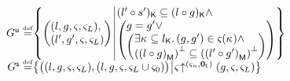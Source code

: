 \begin{definition}[Guarantee]
\[\begin{array}{@{} r @{} l @{}}
	\updateG \eqdef &
 	\left\{
	\begin{array}{@{} l @{\hspace*{2pt}} | @{\hspace*{2pt}} r @{}}
	   	\left(
	   	\begin{array}{@{} l @{}}
	     	(l, g, \amod{}, \amod{L}),\\
	     	(l', g', \amod{}, \amod{L})
	   	\end{array}
		\right)
	  	&
	  	\begin{array}{@{} l @{} }
	  		\capPart{(l' \composeL s')}  \subseteq \capPart{(l \composeL g)} \land\\
		  	\left(
		  	\begin{array}{@{} l @{} }
		 		g = g' \lor\\
		 	  	\left(
		 	  	\begin{array}{@{} l @{}}
		 	  		\exsts{\ca{} \subseteq \capPart{l}}
		 	  		(g, g') \in \amod{}(\ca{}) \land\\
		 	  	
		 	  	\heapSize{\heapPart{\left(l \composeL g\right)}} \subseteq 
		 	  	\heapSize{\heapPart{\left(l' \composeL g'\right)}}
		 	  	\end{array}	
		 	  	\right)
		 	\end{array}
	   		\right)
   		\end{array}
 	\end{array}
	\right\}\\
	
	
	
	\shiftG \eqdef & 
	\left\{
	\begin{array}{@{} l @{\hspace*{2pt}} | @{\hspace*{2pt}} r @{}}
	   \left(
	   \begin{array}{@{} l @{}}
	     (l, g, \amod{}, \amod{L}),
 	     \left( l, g, \amod{}, \amod{L} \cup \amod{0}  \right)
	   \end{array}
 	  \right)
	   &
	   
	   \expandsAM{\amod{}}{\amod{n}}{\unitL}{g}{\amod{}}{\amod{L}}
 	\end{array}
	\right\}

\end{array}
\]
%
\end{definition}

